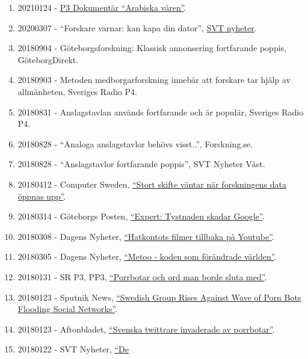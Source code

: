 \documentclass[
]{article}
\providecommand{\tightlist}{%
  \setlength{\itemsep}{0pt}\setlength{\parskip}{0pt}}
\begin{document}
\begin{enumerate}
\def\labelenumi{\arabic{enumi}.}
\tightlist
\item
  20210124 - \href{https://sverigesradio.se/avsnitt/1630734}{P3
  Dokumentär ``Arabiska våren''}.
\item
  20200307 - ``Forskare varnar: kan kapa din dator'',
  \href{https://www.svt.se/nyheter/forskaren-varnar-kan-kapa-din-dator}{SVT
  nyheter}.
\item
  20180904 - Göteborgsforskning: Klassisk annonsering fortfarande
  poppis, GöteborgDirekt.
\item
  20180903 - Metoden medborgarforskning innebär att forskare tar hjälp
  av allmänheten, Sveriges Radio P4.
\item
  20180831 - Anslagstavlan används fortfarande och är populär, Sveriges
  Radio P4.
\item
  20180828 - ``Analoga anslagstavlor behövs visst..'', Forskning.se.
\item
  20180828 - ``Anslagstavlor fortfarande poppis'', SVT Nyheter Väst.
\item
  20180412 - Computer Sweden,
  \href{https://computersweden.idg.se/2.2683/1.700745/forskning-data}{``Stort
  skifte väntar när forskningens data öppnas upp''}.
\item
  20180314 - Göteborgs Posten,
  \href{http://www.gp.se/nyheter/ekonomi/experten-d\%C3\%A4rf\%C3\%B6r-skadar-tystnaden-google-1.5393870}{``Expert:
  Tystnaden skadar Google''}.
\item
  20180308 - Dagens Nyheter,
  \href{https://www.dn.se/nyheter/sverige/hatkontots-filmer-tillbaka-pa-youtube/}{``Hatkontots
  filmer tillbaka på Youtube''}.
\item
  20180305 - Dagens Nyheter,
  \href{https://www.dn.se/nyheter/vetenskap/metoo-koden-som-forandrade-varlden/}{``Metoo
  - koden som förändrade världen''}.
\item
  20180131 - SR P3, PP3, \href{http://t.sr.se/2Gv0I2K}{``Porrbotar och
  ord man borde sluta med''}.
\item
  20180123 - Sputnik News,
  \href{https://sputniknews.com/viral/201801231060991240-sweden-bots-porn-storm/}{``Swedish
  Group Rises Against Wave of Porn Bots Flooding Social Networks''}.
\item
  20180123 - Aftonbladet,
  \href{https://www.aftonbladet.se/nyheter/a/On3x0w/svenska-twittrare-invaderade-av-porrbotar}{``Svenska
  twittrare invaderade av porrbotar''}.
\item
  20180122 - SVT Nyheter,
  \href{https://www.svt.se/nyheter/inrikes/de-kartlagger-porrbotarna-pa-twitter}{``De
}
\end{enumerate}
\end{document}
